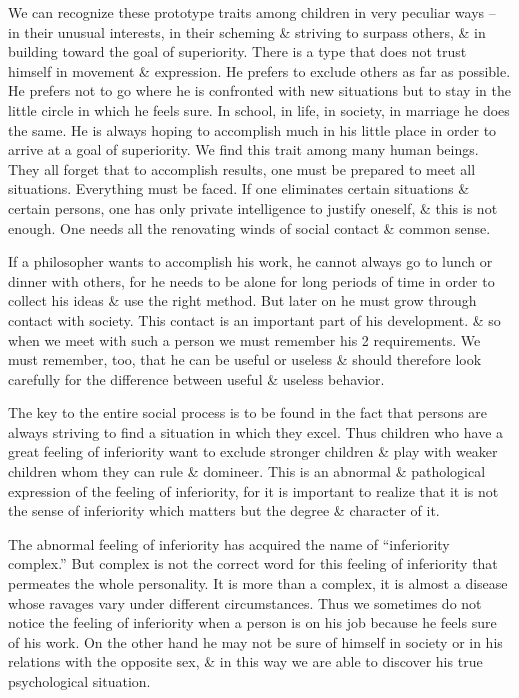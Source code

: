 \documentclass{article}
\begin{document}
We can recognize these prototype traits among children in very peculiar ways -- in their unusual interests, in their scheming \& striving to surpass others, \& in building toward the goal of superiority. There is a type that does not trust himself in movement \& expression. He prefers to exclude others as far as possible. He prefers not to go where he is confronted with new situations but to stay in the little circle in which he feels sure. In school, in life, in society, in marriage he does the same. He is always hoping to accomplish much in his little place in order to arrive at a goal of superiority. We find this trait among many human beings. They all forget that to accomplish results, one must be prepared to meet all situations. Everything must be faced. If one eliminates certain situations \& certain persons, one has only private intelligence to justify oneself, \& this is not enough. One needs all the renovating winds of social contact \& common sense.

If a philosopher wants to accomplish his work, he cannot always go to lunch or dinner with others, for he needs to be alone for long periods of time in order to collect his ideas \& use the right method. But later on he must grow through contact with society. This contact is an important part of his development. \& so when we meet with such a person we must remember his 2 requirements. We must remember, too, that he can be useful or useless \& should therefore look carefully for the difference between useful \& useless behavior.

The key to the entire social process is to be found in the fact that persons are always striving to find a situation in which they excel. Thus children who have a great feeling of inferiority want to exclude stronger children \& play with weaker children whom they can rule \& domineer. This is an abnormal \& pathological expression of the feeling of inferiority, for it is important to realize that it is not the sense of inferiority which matters but the degree \& character of it.

The abnormal feeling of inferiority has acquired the name of ``inferiority complex.'' But complex is not the correct word for this feeling of inferiority that permeates the whole personality. It is more than a complex, it is almost a disease whose ravages vary under different circumstances. Thus we sometimes do not notice the feeling of inferiority when a person is on his job because he feels sure of his work. On the other hand he may not be sure of himself in society or in his relations with the opposite sex, \& in  this way we are able to discover his true psychological situation.
\end{document}

